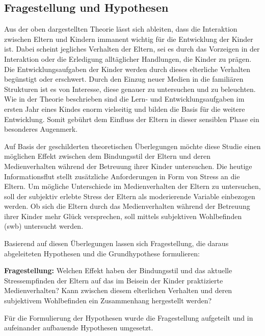 \subsection{Fragestellung und Hypothesen} \label{sec:Fragestellung}
Aus der oben dargestellten Theorie lässt sich ableiten, dass die Interaktion zwischen Eltern und Kindern immanent wichtig für die Entwicklung der Kinder ist. Dabei scheint jegliches Verhalten der Eltern, sei es durch das Vorzeigen in der Interaktion oder die Erledigung alltäglicher Handlungen, die Kinder zu prägen. Die Entwicklungsaufgaben der Kinder werden durch dieses elterliche Verhalten begünstigt oder erschwert. Durch den Einzug neuer Medien in die familiären Strukturen ist es von Interesse, diese genauer zu untersuchen und zu beleuchten. Wie in der Theorie beschrieben sind die Lern- und Entwicklungsaufgaben im ersten Jahr eines Kindes enorm vielseitig und bilden die Basis für die weitere Entwicklung. Somit gebührt dem Einfluss der Eltern in dieser sensiblen Phase ein besonderes Augenmerk. 

Auf Basis der geschilderten theoretischen Überlegungen möchte diese Studie einen möglichen Effekt zwischen dem Bindungsstil der Eltern und deren Medienverhalten während der Betreuung ihrer Kinder untersuchen. Die heutige Informationsflut stellt zusätzliche Anforderungen in Form von Stress an die Eltern. Um mögliche Unterschiede im Medienverhalten der Eltern zu untersuchen, soll der subjektiv erlebte Stress der Eltern als moderierende Variable einbezogen werden. Ob sich die Eltern durch das Medienverhalten während der Betreuung ihrer Kinder mehr Glück versprechen, soll mittels subjektiven Wohlbefinden (\acrshort{swb}) untersucht werden.

Basierend auf diesen Überlegungen lassen sich Fragestellung, die daraus abgeleiteten Hypothesen und die Grundhypothese formulieren:

\textbf{Fragestellung:}
Welchen Effekt haben der Bindungsstil und das aktuelle Stressempfinden der Eltern auf das im Beisein der Kinder praktizierte Medienverhalten? Kann zwischen diesem elterlichen Verhalten und deren subjektivem Wohlbefinden ein Zusammenhang hergestellt werden?

Für die Formulierung der Hypothesen wurde die Fragestellung aufgeteilt und in aufeinander aufbauende Hypothesen umgesetzt. 

